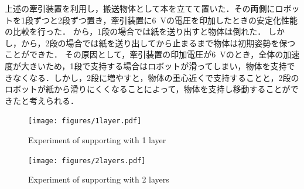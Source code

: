 上述の牽引装置を利用し，搬送物体として本を立てて置いた．その両側にロボットを1段ずつと2段ずつ置き，牽引装置に6~Vの電圧を印加したときの安定化性能の比較を行った．
から，1段の場合では紙を送り出すと物体は倒れた．
しかし，から，2段の場合では紙を送り出してから止まるまで物体は初期姿勢を保つことができた．
その原因として，牽引装置の印加電圧が6~Vのとき，全体の加速度が大きいため，1段で支持する場合はロボットが滑ってしまい，物体を支持できなくなる．しかし，2段に増やすと，物体の重心近くで支持することと，2段のロボットが紙から滑りにくくなることによって，物体を支持し移動することができたと考えられる．
\begin{figure}[tb]
  \centering
  \texttt{[image: figures/1layer.pdf]}
  \caption{Experiment of supporting with 1 layer}
  \label{fig:1layer}
\end{figure}
\begin{figure}[tb]
  \centering
  \texttt{[image: figures/2layers.pdf]}
  \caption{Experiment of supporting with 2 layers}
  \label{fig:2layer}
\end{figure}

